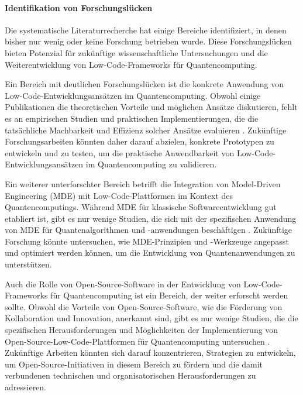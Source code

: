 \paragraph{Identifikation von Forschungslücken}

Die systematische Literaturrecherche hat einige Bereiche identifiziert, in denen bisher nur wenig oder keine Forschung 
betrieben wurde. Diese Forschungslücken bieten Potenzial für zukünftige wissenschaftliche Untersuchungen und 
die Weiterentwicklung von Low-Code-Frameworks für Quantencomputing.

Ein Bereich mit deutlichen Forschungslücken ist die konkrete Anwendung von Low-Code-Entwicklungsansätzen im 
Quantencomputing. Obwohl einige Publikationen die theoretischen Vorteile und möglichen Ansätze diskutieren, 
fehlt es an empirischen Studien und praktischen Implementierungen, die die tatsächliche Machbarkeit und Effizienz 
solcher Ansätze evaluieren \cite{Pérez-Delgado_2020, Gemeinhardt_2021}. Zukünftige Forschungsarbeiten könnten daher 
darauf abzielen, konkrete Prototypen zu entwickeln und zu testen, um die praktische Anwendbarkeit von 
Low-Code-Entwicklungsansätzen im Quantencomputing zu validieren.

Ein weiterer unterforschter Bereich betrifft die Integration von Model-Driven Engineering (MDE) mit Low-Code-Plattformen 
im Kontext des Quantencomputings. Während MDE für klassische Softwareentwicklung gut etabliert ist, gibt es nur wenige 
Studien, die sich mit der spezifischen Anwendung von MDE für Quantenalgorithmen und -anwendungen 
beschäftigen \cite{Gemeinhardt_2023, Pérez-Castillo_2022}. Zukünftige Forschung könnte untersuchen, wie MDE-Prinzipien 
und -Werkzeuge angepasst und optimiert werden können, um die Entwicklung von Quantenanwendungen zu unterstützen.

Auch die Rolle von Open-Source-Software in der Entwicklung von Low-Code-Frameworks für Quantencomputing ist ein Bereich, 
der weiter erforscht werden sollte. Obwohl die Vorteile von Open-Source-Software, wie die Förderung von Kollaboration und 
Innovation, anerkannt sind, gibt es nur wenige Studien, die die spezifischen Herausforderungen und Möglichkeiten der 
Implementierung von Open-Source-Low-Code-Plattformen für Quantencomputing untersuchen \cite{Amato_2023, Ahmad_2023}. 
Zukünftige Arbeiten könnten sich darauf konzentrieren, Strategien zu entwickeln, um Open-Source-Initiativen in diesem 
Bereich zu fördern und die damit verbundenen technischen und organisatorischen Herausforderungen zu adressieren.

